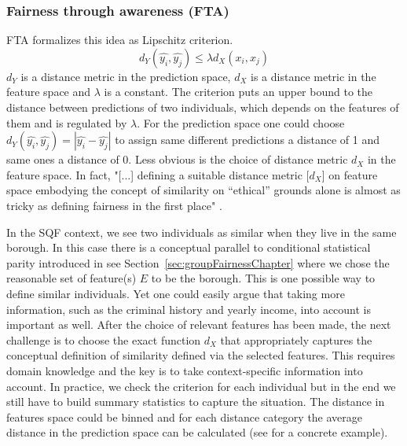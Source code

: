 \subsubsection*{Fairness through awareness (FTA)}
FTA formalizes this idea as Lipschitz criterion. $$d_Y(\hat{y_i}, \hat{y_j}) \leq \lambda {d_X}(x_i, x_j)$$
$d_Y$ is a distance metric in the prediction space, $d_X$ is a distance metric in the feature space and $\lambda$ is a constant.
The criterion puts an upper bound to the distance between predictions of two individuals, which depends on the features of them and is regulated by $\lambda$. For the prediction space one could choose $d_Y(\hat{y_i}, \hat{y_j}) = |\hat{y_i} - \hat{y_j}|$ to assign same different predictions a distance of 1 and same ones a distance of 0. Less obvious is the choice of distance metric $d_X$ in the feature space. In fact, "[...] defining a suitable distance metric [$d_X$] on feature space embodying the concept of similarity on  “ethical” grounds alone is almost as tricky as defining fairness in the first place" \cite{castelnovo2022}.\par
In the SQF context, we see two individuals as similar when they live in the same borough. In this case there is a conceptual parallel to conditional statistical parity introduced in see Section~\ref{sec:groupFairnessChapter} where we chose the reasonable set of feature(s) $E$ to be the borough.
This is one possible way to define similar individuals. Yet one could easily argue that taking more information, such as the criminal history and yearly income, into account is important as well. After the choice of relevant features has been made, the next challenge is to choose the exact function $d_X$ that appropriately captures the conceptual definition of similarity defined via the selected features.
This requires domain knowledge and the key is to take context-specific information into account. In practice, we check the criterion for each individual but in the end we still have to build summary statistics to capture the situation. The distance in features space could be binned and for each distance category the average distance in the prediction space can be calculated (see \cite{verma2018} for a concrete example).

